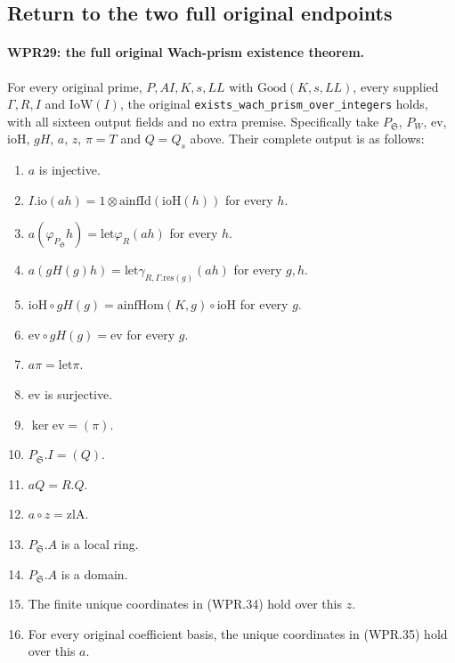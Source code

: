 \subsection{Return to the two full original endpoints}

\paragraph{WPR29: the full original Wach-prism existence theorem.}
\label{claim:WPR29}
For every original prime, $P,AI,K,s,LL$ with
$\mathrm{Good}(K,s,LL)$, every supplied $\Gamma,R,I$ and
$\mathrm{IoW}(I)$, the original
\texttt{exists\_\allowbreak wach\_\allowbreak prism\_\allowbreak over\_\allowbreak integers}
holds, with all sixteen output fields and no extra premise.
Specifically take $P_{\mathfrak S}$, $P_W$, $\mathrm{ev}$,
$\mathrm{ioH}$, $gH$, $a$, $z$, $\pi=T$ and $Q=Q_s$ above.
Their complete output is as follows:
\begin{enumerate}
\item $a$ is injective.
\item $I.\mathrm{io}(a h)=1\otimes\mathrm{ainfId}(\mathrm{ioH}(h))$
for every $h$.
\item $a(\varphi_{P_{\mathfrak S}}h)=\mathrm{let}\varphi_R(a h)$
for every $h$.
\item $a(gH(g)h)=\mathrm{let}\gamma_{R,\Gamma.\mathrm{res}(g)}(a h)$
for every $g,h$.
\item $\mathrm{ioH}\circ gH(g)=\mathrm{ainfHom}(K,g)\circ\mathrm{ioH}$
for every $g$.
\item $\mathrm{ev}\circ gH(g)=\mathrm{ev}$ for every $g$.
\item $a\pi=\mathrm{let}\pi$.
\item $\mathrm{ev}$ is surjective.
\item $\ker\mathrm{ev}=(\pi)$.
\item $P_{\mathfrak S}.I=(Q)$.
\item $aQ=R.Q$.
\item $a\circ z=\mathrm{zlA}$.
\item $P_{\mathfrak S}.A$ is a local ring.
\item $P_{\mathfrak S}.A$ is a domain.
\item The finite unique coordinates in (WPR.34) hold over this $z$.
\item For every original coefficient basis, the unique coordinates
in (WPR.35) hold over this $a$.
\end{enumerate}

